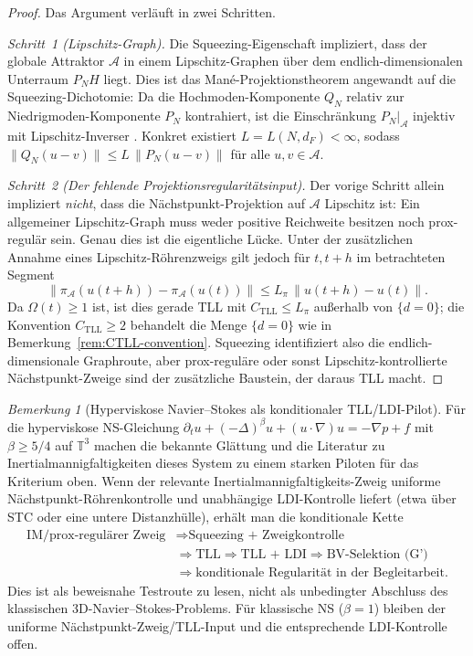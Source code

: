 \documentclass[12pt,a4paper]{article}
\theoremstyle{definition}
\theoremstyle{plain}
\theoremstyle{remark}
\newtheorem{remark}[definition]{Bemerkung}
\begin{document}
\begin{proof}
Das Argument verläuft in zwei Schritten.

\emph{Schritt~1 (Lipschitz-Graph).}
Die Squeezing-Eigenschaft impliziert, dass der globale Attraktor $\mathcal{A}$
in einem Lipschitz-Graphen über dem endlich-dimensionalen Unterraum $P_N H$ liegt.
Dies ist das Mané-Projektionstheorem angewandt auf die Squeezing-Dichotomie:
Da die Hochmoden-Komponente $Q_N$ relativ zur Niedrigmoden-Komponente $P_N$
kontrahiert, ist die Einschränkung $P_N|_{\mathcal{A}}$ injektiv mit
Lipschitz-Inverser \cite{FoiasTemam1979,Mane1981}.
Konkret existiert $L = L(N, d_F) < \infty$, sodass
$\|Q_N(u - v)\| \leq L\,\|P_N(u - v)\|$ für alle $u, v \in \mathcal{A}$.

\emph{Schritt~2 (Der fehlende Projektionsregularitätsinput).}
Der vorige Schritt allein impliziert \emph{nicht}, dass die
Nächstpunkt-Projektion auf $\mathcal{A}$ Lipschitz ist: Ein allgemeiner
Lipschitz-Graph muss weder positive Reichweite besitzen noch
prox-regulär sein.  Genau dies ist die eigentliche Lücke.  Unter der
zusätzlichen Annahme eines Lipschitz-Röhrenzweigs gilt jedoch für
$t,t+h$ im betrachteten Segment
\[
  \|\pi_{\mathcal{A}}(u(t+h))-\pi_{\mathcal{A}}(u(t))\|
  \le L_\pi\,\|u(t+h)-u(t)\|.
\]
Da $\Omega(t)\ge 1$ ist, ist dies gerade TLL mit
$C_{\mathrm{TLL}}\le L_\pi$ außerhalb von $\{d=0\}$; die Konvention
$C_{\mathrm{TLL}}\ge 2$ behandelt die Menge $\{d=0\}$ wie in
Bemerkung~\ref{rem:CTLL-convention}.  Squeezing identifiziert also
die endlich-dimensionale Graphroute, aber prox-reguläre oder sonst
Lipschitz-kontrollierte Nächstpunkt-Zweige sind der zusätzliche
Baustein, der daraus TLL macht.
\end{proof}

\begin{remark}[Hyperviskose Navier--Stokes als konditionaler TLL/LDI-Pilot]
\label{rem:hyperviscous}
Für die hyperviskose NS-Gleichung $\partial_t u + (-\Delta)^\beta u + (u\cdot\nabla)u = -\nabla p + f$
mit $\beta \geq 5/4$ auf $\mathbb{T}^3$ machen die bekannte
Glättung und die Literatur zu Inertialmannigfaltigkeiten dieses System
zu einem starken Piloten für das Kriterium oben.  Wenn der relevante
Inertialmannigfaltigkeits-Zweig uniforme Nächstpunkt-Röhrenkontrolle
und unabhängige LDI-Kontrolle liefert (etwa über STC oder eine untere
Distanzhülle), erhält man die konditionale Kette
\[
\begin{aligned}
  \text{IM/prox-regulärer Zweig}
  &\Rightarrow \text{Squeezing + Zweigkontrolle}\\
  &\Rightarrow \text{TLL}
  \Rightarrow \text{TLL + LDI}
  \Rightarrow \text{BV-Selektion (G')}\\
  &\Rightarrow \text{konditionale Regularität in der Begleitarbeit}.
\end{aligned}
\]
Dies ist als beweisnahe Testroute zu lesen, nicht als unbedingter
Abschluss des klassischen 3D-Navier--Stokes-Problems.  Für klassische
NS ($\beta = 1$) bleiben der uniforme Nächstpunkt-Zweig/TLL-Input und
die entsprechende LDI-Kontrolle offen.
\end{remark}
\end{document}
